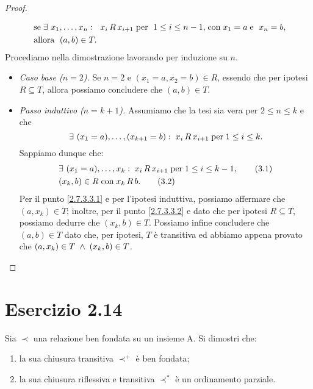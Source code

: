 \begin{proof}
\begin{enumerate}[leftmargin=*]
\begin{align*}
	& \; \text{se} \; \exists \ x_1, \ldots, x_n
	:\; \ x_i \, R \, x_{i+1} \; \text{per} \; \ 1 \leq i \leq n-1 \text{,} 
	\; \text{con} \; x_1 = a \; \text{e} \; \ x_n = b, \\
	& \; \text{allora} \; \ (a,b) \in T.
\end{align*}
Procediamo nella dimostrazione lavorando per induzione su $n$.
\begin{itemize}
\item \textit{Caso base ($n=2$).} Se $n=2$ e $(x_1=a,x_2=b) \in R$, essendo che per ipotesi $R \subseteq T$, allora possiamo concludere che $(a,b) \in T$.
\item \textit{Passo induttivo ($n=k+1$).} Assumiamo che la tesi sia vera per $2 \leq n \leq k$ e che \[
	\exists \ (x_1=a), \ldots, (x_{k+1}=b) 
	:\; x_i \, R \, x_{i+1} \; \text{per} \; 1 \leq i \leq k.
\]
Sappiamo dunque che:
\begin{align}
	&\exists \ (x_1=a), \ldots, x_k :\; x_i \, R \, x_{i+1} 
		\; \text{per} \; 1 \leq i \leq k-1, \label{2.7.3.3.1} \tag{3.1} \\
	&(x_k, b) \in R \; \text{con} \; x_k \, R \, b. \label{2.7.3.3.2} \tag{3.2}
\end{align}
Per il punto \ref{2.7.3.3.1} e per l'ipotesi induttiva, possiamo affermare che $(a,x_k) \in T$; inoltre, per il punto \ref{2.7.3.3.2} e dato che per ipotesi $R \subseteq T$, possiamo dedurre che $(x_k, b) \in T$.
Possiamo infine concludere che $(a,b) \in T$ dato che, per ipotesi, $T$ è transitiva ed abbiamo appena provato che $(a,x_k) \in T \; \land \; (x_k, b) \in T$.
\end{itemize}

\end{enumerate}
\end{proof}

\section*{Esercizio 2.14}
{}
\label{es:2.14}

\begin{tcolorbox} \cite{mssc2016}
Sia $\prec$ una relazione ben fondata su un insieme A. Si dimostri che:
\begin{enumerate}
\item la sua chiusura transitiva $\prec^+$ è ben fondata;
\item la sua chiusura riflessiva e transitiva $\prec^*$ è un ordinamento parziale.
\end{enumerate}
\end{tcolorbox}

